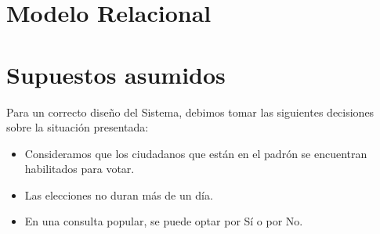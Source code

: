\documentclass[10pt,a4paper]{article}
\begin{document}
\section{Modelo Relacional}

\newpage
\section{Supuestos asumidos}
Para un correcto diseño del Sistema, debimos tomar las siguientes decisiones sobre la situación presentada:
\begin{itemize}
\item Consideramos que los ciudadanos que están en el padrón se encuentran habilitados para votar.
\item Las elecciones no duran más de un día.
\item En una consulta popular, se puede optar por Sí o por No.
\end{itemize}





\end{document}
